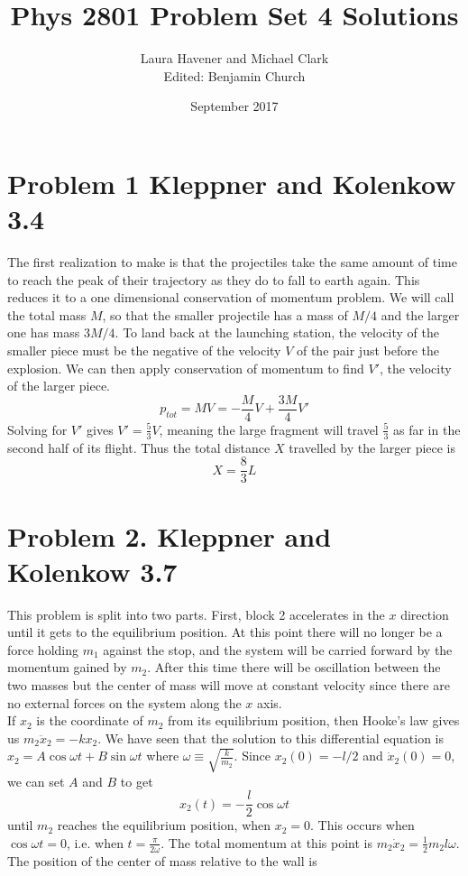\documentclass[11pt]{article}
\title{Phys 2801 Problem Set 4 Solutions}
\author{Laura Havener and Michael Clark \\ Edited: Benjamin Church}
\date{September 2017}
\begin{document}
\maketitle

\section*{Problem 1 Kleppner and Kolenkow 3.4}

The first realization to make is that the projectiles take the same amount of time to reach the peak of their trajectory as they do to fall to earth again. This reduces it to a one dimensional conservation of momentum problem. We will call the total mass $M$, so that the smaller projectile has a mass of $M/4$ and the larger one has mass $3M/4$. To land back at the launching station, the velocity of the smaller piece must be the negative of the velocity $V$ of the pair just before the explosion. We can then apply conservation of momentum to find $V'$, the velocity of the larger piece.
$$p_{tot} = MV = -\frac{M}{4}V + \frac{3M}{4}V'$$
Solving for $V'$ gives $V' = \frac{5}{3}V$, meaning the large fragment will travel $\frac{5}{3}$ as far in the second half of its flight. Thus the total distance $X$  travelled by the larger piece is
$$X = \frac{8}{3}L$$


\section*{Problem 2. Kleppner and Kolenkow 3.7}

This problem is split into two parts. First, block 2 accelerates in the $x$ direction until it gets to the equilibrium position. At this point there will no longer be a force holding $m_1$ against the stop, and the system will be carried forward by the momentum gained by $m_2$. After this time there will be oscillation between the two masses but the center of mass will move at constant velocity since there are no external forces on the system along the $x$ axis.\\
\indent
If $x_2$ is the coordinate of $m_2$ from its equilibrium position, then Hooke's law gives us $m_2 \ddot{x}_2 = -k x_2$. We have seen that the solution to this differential equation is $x_2 = A\cos{\omega t} + B\sin{\omega t}$ where $\omega \equiv \sqrt{\frac{k}{m_2}}$. Since $x_2(0) = -l/2$ and $\dot{x}_2(0) = 0$, we can set $A$ and $B$ to get
$$x_2(t) = -\frac{l}{2}\cos{\omega t}$$
until $m_2$ reaches the equilibrium position, when $x_2 = 0$. This occurs when $\cos{\omega t} = 0$, i.e. when $t = \frac{\pi}{2\omega}$. The total  momentum at this point is $m_2 \dot{x}_2 = \frac{1}{2}m_2 l \omega$.\\
\indent
The position of the center of mass relative to the wall is
\end{document}
